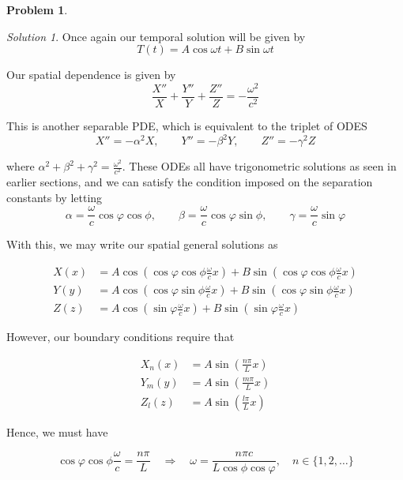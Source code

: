 \documentclass[12pt,a4paper]{article}
\theoremstyle{definition}
\newtheorem{problem}{Problem}
\theoremstyle{remark}
\newtheorem*{solution}{Solution}
\begin{document}
\begin{problem}
\begin{enumerate}[label=(\alph*)]
\begin{solution}
            Once again our temporal solution will be given by $$T(t) = A \cos \omega t + B \sin \omega t$$

            Our spatial dependence is given by $$\frac{X''}{X}+ \frac{Y''}{Y} + \frac{Z''}{Z} = - \frac{\omega^2}{c^2}$$

            This is another separable PDE, which is equivalent to the triplet of ODES $$X'' = - \alpha^2 X, \qquad Y'' = -\beta^2 Y, \qquad Z'' = - \gamma^2 Z$$

            where $\alpha^2 + \beta^2 + \gamma^2 = \frac{\omega^2}{c^2}$. These ODEs all have trigonometric solutions as seen in earlier sections, and we can satisfy the condition imposed on the separation constants by letting $$\alpha = \frac{\omega}{c}\cos \varphi \cos \phi, \qquad \beta = \frac{\omega}{c}\cos \varphi \sin \phi, \qquad \gamma = \frac{\omega}{c}\sin \varphi$$

            With this, we may write our spatial general solutions as 
            
            \begin{align*}
                X(x) &= A \cos \left( \cos \varphi \cos \phi \frac{\omega}{c} x\right) + B \sin \left( \cos \varphi \cos \phi \frac{\omega}{c} x\right) \\
                Y(y) &= A \cos \left( \cos \varphi \sin \phi \frac{\omega}{c} x\right) + B \sin \left( \cos \varphi \sin \phi \frac{\omega}{c} x\right) \\
                Z(z) &= A \cos \left( \sin \varphi \frac{\omega}{c} x\right) + B \sin \left( \sin \varphi \frac{\omega}{c} x\right)
            \end{align*}

            However, our boundary conditions require that 

            \begin{align*}
                X_n(x) &= A \sin \left( \frac{n \pi}{L} x\right) \\
                Y_m(y) &= A \sin \left( \frac{m \pi}{L} x\right) \\
                Z_l(z) &= A \sin \left( \frac{l \pi}{L} x\right)
            \end{align*}

            Hence, we must have 
            
            $$\cos \varphi \cos \phi \frac{\omega}{c} = \frac{n \pi}{L} \quad \Rightarrow \quad \omega = \frac{n \pi c}{L\cos \phi \cos \varphi}, \quad n \in \{1, 2, \dots \}$$
            

\end{solution}
\end{enumerate}
\end{problem}
\end{document}
